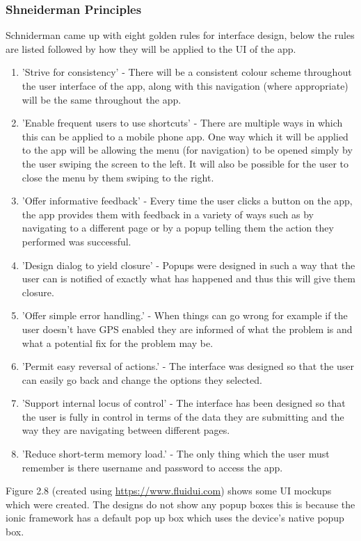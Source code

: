 \subsubsection{Shneiderman Principles}
Schniderman came up with eight golden rules for interface design, below the rules are listed followed by how they will be applied to the UI of the app. \cite{sch}
\begin{enumerate}
	\item 'Strive for consistency' - There will be a consistent colour scheme throughout the user interface of the app, along with this navigation (where appropriate) will be the same throughout the app.
	\item 'Enable frequent users to use shortcuts' - There are multiple ways in which this can be applied to a mobile phone app. One way which it will be applied to the app will be allowing the menu (for navigation) to be opened simply by the user swiping the screen to the left. It will also be possible for the user to close the menu by them swiping to the right.
	\item 'Offer informative feedback' - Every time the user clicks a button on the app, the app provides them with feedback in a variety of ways such as by navigating to a different page or by a popup telling them the action they performed was successful.
	\item 'Design dialog to yield closure' - Popups were designed in such a way that the user can is notified of exactly what has happened and thus this will give them closure.
	\item 'Offer simple error handling.' - When things can go wrong for example if the user doesn't have GPS enabled they are informed of what the problem is and what a potential fix for the problem may be.
	\item 'Permit easy reversal of actions.' - The interface was designed so that the user can easily go back and change the options they selected.
	\item 'Support internal locus of control' - The interface has been designed so that the user is fully in control in terms of the data they are submitting and the way they are navigating between different pages.
	\item 'Reduce short-term memory load.' - The only thing which the user must remember is there username and password to access the app.
\end{enumerate}
Figure 2.8 (created using \url {https://www.fluidui.com}) shows some UI mockups which were created. The designs do not show any popup boxes this is because the ionic framework has a default pop up box which uses the device's native popup box.
